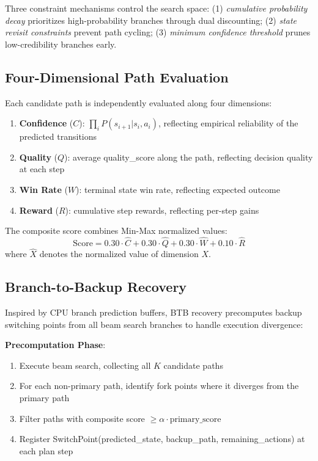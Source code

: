 \documentclass[letterpaper]{article}
\begin{document}
Three constraint mechanisms control the search space: (1) \textit{cumulative probability decay} prioritizes high-probability branches through dual discounting; (2) \textit{state revisit constraints} prevent path cycling; (3) \textit{minimum confidence threshold} prunes low-credibility branches early.

\subsection{Four-Dimensional Path Evaluation}

Each candidate path is independently evaluated along four dimensions:

\begin{enumerate}
	\item \textbf{Confidence} ($C$): $\prod_i P(s_{i+1}|s_i, a_i)$, reflecting empirical reliability of the predicted transitions
	\item \textbf{Quality} ($Q$): average quality\_score along the path, reflecting decision quality at each step
	\item \textbf{Win Rate} ($W$): terminal state win rate, reflecting expected outcome
	\item \textbf{Reward} ($R$): cumulative step rewards, reflecting per-step gains
\end{enumerate}

The composite score combines Min-Max normalized values:
\begin{equation}
	\text{Score} = 0.30 \cdot \hat{C} + 0.30 \cdot \hat{Q} + 0.30 \cdot \hat{W} + 0.10 \cdot \hat{R}
\end{equation}
where $\hat{X}$ denotes the normalized value of dimension $X$.

\subsection{Branch-to-Backup Recovery}

Inspired by CPU branch prediction buffers, BTB recovery precomputes backup switching points from all beam search branches to handle execution divergence:

\textbf{Precomputation Phase}:
\begin{enumerate}
	\item Execute beam search, collecting all $K$ candidate paths
	\item For each non-primary path, identify fork points where it diverges from the primary path
	\item Filter paths with composite score $\geq \alpha \cdot \text{primary\_score}$
	\item Register SwitchPoint(predicted\_state, backup\_path, remaining\_actions) at each plan step
\end{enumerate}
\end{document}
